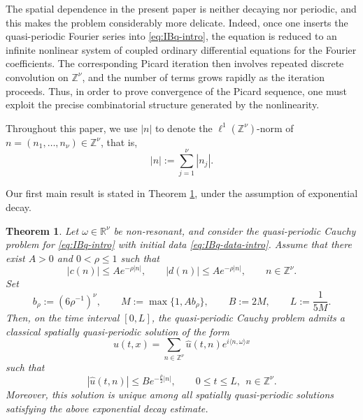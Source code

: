 \documentclass[12pt,reqno,tbtags]{amsart}
\newtheorem{theorem}{Theorem}[section]
\newtheorem{remark}{Remark}[section]
\newcommand\1{\mathbbm{1}}
\begin{document}
The spatial dependence in the present paper is neither decaying nor periodic, and this makes the problem considerably more delicate. Indeed, once one inserts the quasi-periodic Fourier series into \eqref{eq:IBq-intro}, the equation is reduced to an infinite nonlinear system of coupled ordinary differential equations for the Fourier coefficients. The corresponding Picard iteration then involves repeated discrete convolution on $\mathbb{Z}^{\nu}$, and the number of terms grows rapidly as the iteration proceeds. Thus, in order to prove convergence of the Picard sequence, one must exploit the precise combinatorial structure generated by the nonlinearity.

Throughout this paper, we use $|n|$ to denote the $\ell^1(\mathbb{Z}^\nu)$-norm of
$n=(n_1,\dots,n_\nu)\in\mathbb{Z}^\nu$, that is,
\[
|n|:=\sum_{j=1}^{\nu}|n_j|.
\]

Our first main result is stated in Theorem \ref{thm:exponential decay}, under the assumption of exponential decay.







\begin{theorem}\label{thm:exponential decay}
Let $\omega\in \mathbb{R}^{\nu}$ be non-resonant, and consider the quasi-periodic
Cauchy problem for \eqref{eq:IBq-intro}
with initial data \eqref{eq:IBq-data-intro}.
Assume that there exist $A>0$ and $0<\rho\leq 1$ such that
\[
|c(n)|\leq A e^{-\rho |n|},
\qquad
|d(n)|\leq A e^{-\rho |n|},
\qquad n\in \mathbb{Z}^{\nu}.
\]
Set
\[
b_{\rho}:=(6\rho^{-1})^{\nu},
\qquad
M:=\max\{1,Ab_{\rho}\},
\qquad
B:=2M,
\qquad
L:=\frac{1}{5M}.
\]
Then, on the time interval $[0,L]$, the quasi-periodic Cauchy problem admits a classical spatially
quasi-periodic solution of the form
\[
u(t,x)=\sum_{n\in \mathbb{Z}^{\nu}} \widehat{u}(t,n)e^{i\langle n,\omega\rangle x}
\]
such that
\[
|\widehat{u}(t,n)|\leq B e^{-\frac{\rho}{2}|n|},
\qquad
0\leq t\leq L,\ \ n\in \mathbb{Z}^{\nu}.
\]
Moreover, this solution is unique among all spatially quasi-periodic solutions
satisfying the above exponential decay estimate.
\end{theorem}

\end{document}
